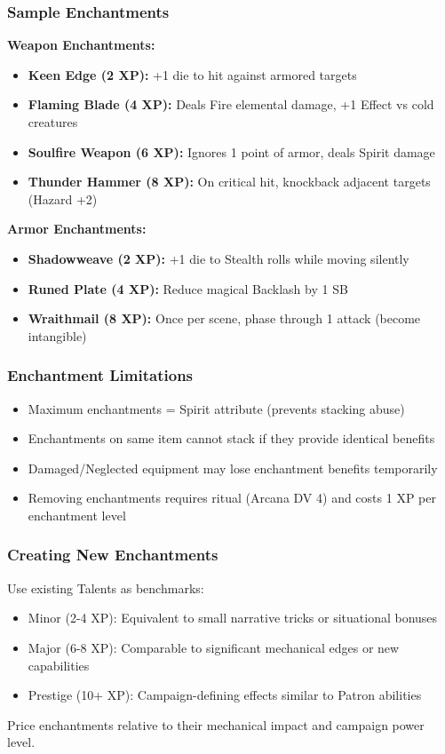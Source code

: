 \subsubsection{Sample Enchantments}

\textbf{Weapon Enchantments:}
\begin{itemize}
\item \textbf{Keen Edge (2 XP):} +1 die to hit against armored targets
\item \textbf{Flaming Blade (4 XP):} Deals Fire elemental damage, +1 Effect vs cold creatures
\item \textbf{Soulfire Weapon (6 XP):} Ignores 1 point of armor, deals Spirit damage
\item \textbf{Thunder Hammer (8 XP):} On critical hit, knockback adjacent targets (Hazard +2)
\end{itemize}

\textbf{Armor Enchantments:}
\begin{itemize}
\item \textbf{Shadowweave (2 XP):} +1 die to Stealth rolls while moving silently
\item \textbf{Runed Plate (4 XP):} Reduce magical Backlash by 1 SB
\item \textbf{Wraithmail (8 XP):} Once per scene, phase through 1 attack (become intangible)
\end{itemize}

\subsubsection{Enchantment Limitations}

\begin{itemize}
\item Maximum enchantments = Spirit attribute (prevents stacking abuse)
\item Enchantments on same item cannot stack if they provide identical benefits
\item Damaged/Neglected equipment may lose enchantment benefits temporarily
\item Removing enchantments requires ritual (Arcana DV 4) and costs 1 XP per enchantment level
\end{itemize}

\subsubsection{Creating New Enchantments}

Use existing Talents as benchmarks:
\begin{itemize}
\item Minor (2-4 XP): Equivalent to small narrative tricks or situational bonuses
\item Major (6-8 XP): Comparable to significant mechanical edges or new capabilities
\item Prestige (10+ XP): Campaign-defining effects similar to Patron abilities
\end{itemize}

Price enchantments relative to their mechanical impact and campaign power level.
